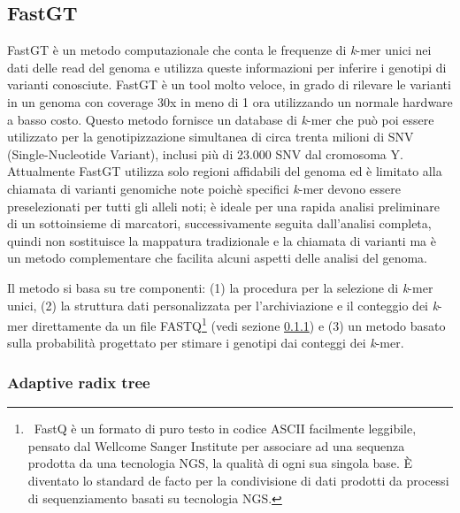 \documentclass[../main.tex]{subfiles}
\begin{document}
\subsection{FastGT}
\label{fastgt}

FastGT \cite{pajuste2017fastgt} è un metodo computazionale che conta le frequenze di \textit{k}-mer unici nei dati delle read del genoma e utilizza queste informazioni per inferire i genotipi di varianti conosciute. FastGT è un tool molto veloce, in grado di rilevare le varianti in un genoma con coverage 30x in meno di 1 ora utilizzando un normale hardware a basso costo. Questo metodo fornisce un database di \textit{k}-mer che può poi essere utilizzato per la genotipizzazione simultanea di circa trenta milioni di SNV (Single-Nucleotide Variant), inclusi più di 23.000 SNV dal cromosoma Y. Attualmente FastGT utilizza solo regioni affidabili del genoma ed è limitato alla chiamata di varianti genomiche note poichè specifici \textit{k}-mer devono essere preselezionati per tutti gli alleli noti; è ideale per una rapida analisi preliminare di un sottoinsieme di marcatori, successivamente seguita dall'analisi completa, quindi non sostituisce la mappatura tradizionale e la chiamata di varianti ma è un metodo complementare che facilita alcuni aspetti delle analisi del genoma.

Il metodo si basa su tre componenti: (1) la procedura per la selezione di \textit{k}-mer unici, (2) la struttura dati personalizzata per l'archiviazione e il conteggio dei \textit{k}-mer direttamente da un file FASTQ\footnote{\ FastQ è un formato di puro testo in codice ASCII facilmente leggibile, pensato dal Wellcome Sanger Institute per associare ad una sequenza prodotta da una tecnologia NGS, la qualità di ogni sua singola base. È diventato lo standard de facto per la condivisione di dati \cite{cock2010sanger} \label{nota:FASTQ} prodotti da processi di sequenziamento basati su tecnologia NGS.} (vedi sezione \ref{AdaptiveRadixTree}) e (3) un metodo basato sulla probabilità progettato per stimare i genotipi dai conteggi dei \textit{k}-mer.

\subsubsection{Adaptive radix tree}
\label{AdaptiveRadixTree}
\end{document}
